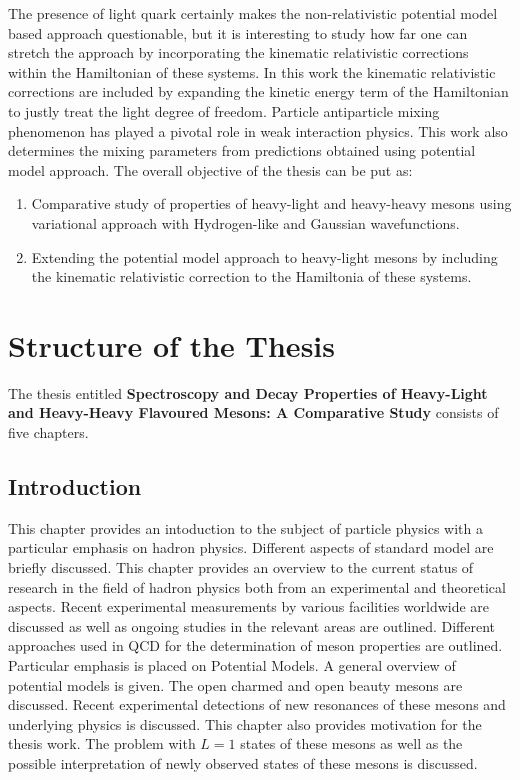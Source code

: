 \documentclass[draft,11pt]{scrreprt}
\begin{document}
The presence of light quark certainly makes the non-relativistic potential model based approach questionable, but it is interesting to study how far one can stretch the approach by incorporating the kinematic relativistic corrections within the Hamiltonian of these systems. In this work the kinematic relativistic corrections are included by expanding the kinetic energy term of the Hamiltonian to justly treat the light degree of freedom. Particle antiparticle mixing phenomenon has played a pivotal role in weak interaction physics. This work also determines the mixing parameters from predictions obtained using potential model approach. The overall objective of the thesis can be put as:
\begin{enumerate}
\item Comparative study of properties of heavy-light and heavy-heavy mesons using variational approach with Hydrogen-like and Gaussian wavefunctions.
\item Extending the potential model approach to heavy-light mesons by including the kinematic relativistic correction to the Hamiltonia of these systems.
\end{enumerate}
\part{Structure of the Thesis}


The thesis entitled \textbf{Spectroscopy and Decay Properties of Heavy-Light and Heavy-Heavy Flavoured Mesons: A Comparative Study} consists of five chapters.
\chapter{Introduction}
This chapter provides an intoduction to the subject of particle physics with a particular emphasis on hadron physics. Different aspects of standard model are briefly discussed.
This chapter provides an overview to the current status of research in the field of hadron physics both from an experimental and theoretical aspects. Recent experimental measurements by various facilities worldwide are discussed as well as ongoing studies in the relevant areas are outlined. Different approaches used in QCD for the determination of meson properties are outlined. Particular emphasis is placed on Potential Models. A general overview of potential models is given. The open charmed and open beauty mesons are discussed. Recent experimental detections of new resonances of these mesons and underlying physics is discussed. This chapter also provides motivation for the thesis work. The problem with $L=1$ states of these mesons as well as the possible interpretation of newly observed states of these mesons is discussed. 
\end{document}
